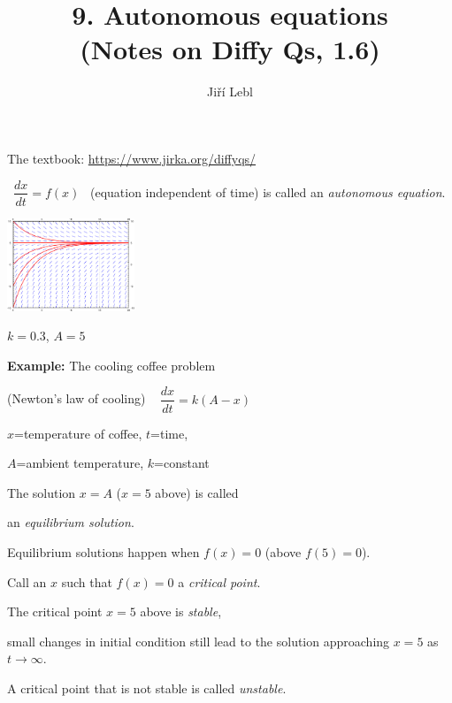\documentclass[10pt,aspectratio=169]{beamer}
\author{Ji\v{r}\'i Lebl}
\institute[OSU]{%
Oklahoma State University%
}
\title{9. Autonomous equations\\(Notes on Diffy Qs, 1.6)}
\date{}
\begin{document}
\begin{frame}
\titlepage


\begin{center}
The textbook: \url{https://www.jirka.org/diffyqs/}
\end{center}
\end{frame}

\begin{frame}
~$\dfrac{dx}{dt} = f(x)$~
(equation independent of time)
is called an
\emph{autonomous equation}.

\medskip
\pause

\hspace*{3.8in} \includegraphics[width=1.5in]{../figures/2-2-coffee}

\hspace*{3.8in} $k=0.3$, $A=5$

\vspace*{-1.3in}

\textbf{Example:} The cooling coffee problem

(Newton's law of cooling)
~
$\dfrac{dx}{dt} = k (A-x)$

$x$=temperature of coffee, $t$=time,

$A$=ambient temperature, $k$=constant

\medskip
\pause

The solution $x=A$ ($x=5$ above) is called

an \emph{equilibrium solution}.

\medskip
\pause

Equilibrium solutions happen when $f(x)=0$ (above $f(5)=0$).

\medskip
\pause

Call an $x$ such that $f(x)=0$ a \emph{critical point}.

\medskip
\pause

The critical point $x=5$ above is \emph{stable},

small changes in initial condition still lead to the solution approaching
$x=5$ as $t \to \infty$.

\medskip
\pause

A critical point that is not stable is called \emph{unstable}.

\end{frame}
\end{document}
